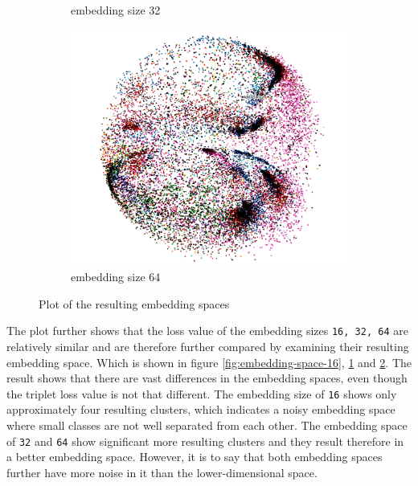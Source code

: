 \begin{figure}[t]
\begin{subfigure}{.33\linewidth}
  \caption{embedding size 32}
  \label{fig:embedding-space-32}
\end{subfigure}%
\begin{subfigure}{.33\linewidth}
  \centering
  \includegraphics[width=.9\linewidth]{study-doc/experiment_embedding_size/assets/embedding_space_64.png}
  \caption{embedding size 64}
  \label{fig:embedding-space-64}
\end{subfigure}
\caption{Plot of the resulting embedding spaces}
\label{fig:embedding-size-experiment-embedding-space}
\end{figure}
\newline
\newline
\noindent
The plot further shows that the loss value of the embedding sizes \texttt{16, 32, 64} are relatively similar and are therefore further compared by examining their resulting embedding space. Which is shown in figure \ref{fig:embedding-space-16}, \ref{fig:embedding-space-32} and \ref{fig:embedding-space-64}. The result shows that there are vast differences in the embedding spaces, even though the triplet loss value is not that different. The embedding size of \texttt{16} shows only approximately four resulting clusters, which indicates a noisy embedding space where small classes are not well separated from each other. The embedding space of \texttt{32} and \texttt{64} show significant more resulting clusters and they result therefore in a better embedding space. However, it is to say that both embedding spaces further have more noise in it than the lower-dimensional space.
\newline
\newline
